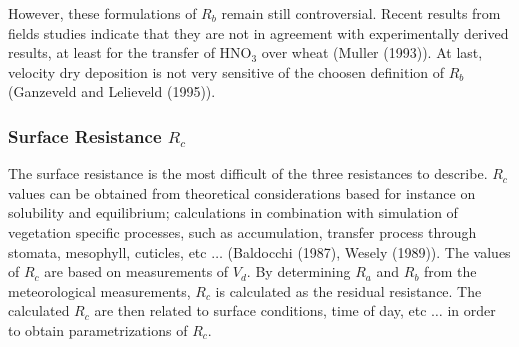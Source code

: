 \medskip

However, these formulations of $R_b$ remain still controversial. 
Recent results from fields studies 
indicate that they
are not in agreement with experimentally derived results, at least
for the transfer of HNO$_3$
over wheat (Muller \etal (1993)\nocite{Muller1993}).
At last, velocity dry deposition is not very sensitive of the choosen
definition of $R_b$ (Ganzeveld and Lelieveld (1995)).
\subsubsection*{Surface Resistance $R_c$}

The surface resistance is the most difficult of the three resistances to
describe. $R_c$ values can be obtained from theoretical considerations based
for instance on solubility and equilibrium; calculations in combination with
simulation of vegetation specific processes, such as accumulation, transfer
process through stomata, mesophyll, cuticles, etc $\ldots$
(Baldocchi \etal (1987)\nocite{Baldocchi1987}, Wesely (1989)\nocite{Wesely1989}). The values of $R_c$ are based on
measurements of $V_d$. By determining $R_a$ and $R_b$ from the meteorological
measurements, $R_c$ is calculated as the residual resistance. The calculated
$R_c$ are then related to surface conditions, time of day, etc $\ldots$ in
order to obtain parametrizations of $R_c$.

